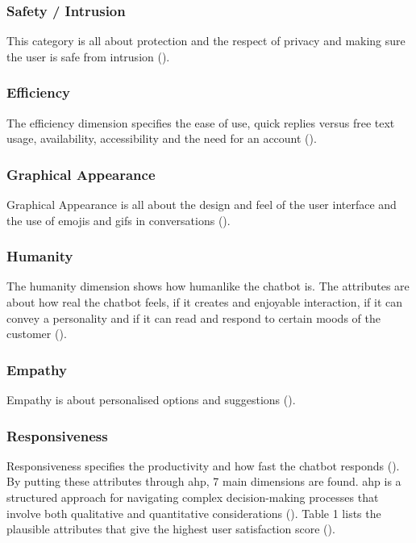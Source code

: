 \subsubsection{Safety / Intrusion}
This category is all about protection and the respect of privacy and making sure the user is safe from intrusion (\cite{Muizzah2021, Verkeyn2018}).\\

\subsubsection{Efficiency}
The efficiency dimension specifies the ease of use, quick replies versus free text usage, availability, accessibility and the need for an account (\cite{Muizzah2021, Verkeyn2018}).\\

\subsubsection{Graphical Appearance}
Graphical Appearance is all about the design and feel of the user interface and the use of emojis and gifs in conversations (\cite{Muizzah2021, Verkeyn2018}).\\

\subsubsection{Humanity}
The humanity dimension shows how humanlike the chatbot is. The attributes are about how real the chatbot feels, if it creates and enjoyable interaction, if it can convey a personality and if it can read and respond to certain moods of the customer (\cite{Muizzah2021, Verkeyn2018}).\\

\subsubsection{Empathy}
Empathy is about personalised options and suggestions (\cite{Muizzah2021, Verkeyn2018}).\\

\subsubsection{Responsiveness}
Responsiveness specifies the productivity and how fast the chatbot responds (\cite{Muizzah2021, Verkeyn2018}).\\
\break
By putting these attributes through \acrfull{ahp}, 7 main dimensions are found. \acrshort{ahp} is a structured approach for navigating complex decision-making processes that involve both qualitative and quantitative considerations (\cite{Radziwil2021}). Table 1 lists the plausible attributes that give the highest user satisfaction score (\cite{Muizzah2021}).\\

